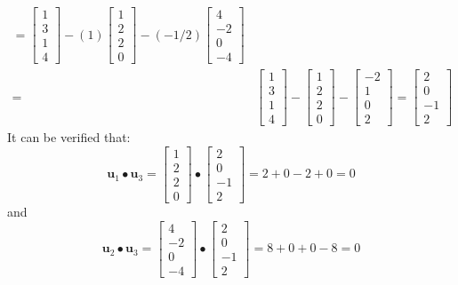 \documentclass{article}
\begin{document}
\begin{description}
\begin{align*}
= \begin{bmatrix} 1 \\ 3 \\ 1 \\ 4 \end{bmatrix} - (1)\begin{bmatrix} 1 \\ 2 \\ 2 \\ 0 \end{bmatrix} - (-1/2)\begin{bmatrix} 4 \\ -2 \\ 0 \\ -4 \end{bmatrix} \\
= & \begin{bmatrix} 1 \\ 3 \\ 1 \\ 4 \end{bmatrix} - \begin{bmatrix} 1 \\ 2 \\ 2 \\ 0 \end{bmatrix} - \begin{bmatrix} -2 \\ 1 \\ 0 \\ 2 \end{bmatrix} 
= \begin{bmatrix} 2 \\ 0 \\ -1 \\ 2 \end{bmatrix} 
\end{align*}
It can be verified that:
\[\mathbf{u}_1 \bullet \mathbf{u}_3 = \begin{bmatrix} 1 \\ 2 \\ 2 \\ 0 \end{bmatrix} \bullet \begin{bmatrix} 2 \\ 0 \\ -1 \\ 2 \end{bmatrix} = 2 + 0 - 2 + 0 = 0\]
and
\[\mathbf{u}_2 \bullet \mathbf{u}_3 = \begin{bmatrix} 4 \\ -2 \\ 0 \\ -4 \end{bmatrix} \bullet \begin{bmatrix} 2 \\ 0 \\ -1 \\ 2 \end{bmatrix} = 8 + 0 + 0 - 8 = 0\]

\end{description}
\end{document}
